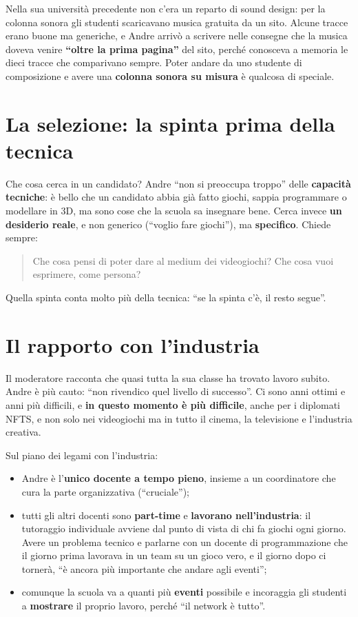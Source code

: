 Nella sua università precedente non c'era un reparto di sound design: per la
colonna sonora gli studenti scaricavano musica gratuita da un sito. Alcune tracce
erano buone ma generiche, e Andre arrivò a scrivere nelle consegne che la musica
doveva venire \textbf{``oltre la prima pagina''} del sito, perché conosceva a memoria
le dieci tracce che comparivano sempre. Poter andare da uno studente di composizione
e avere una \textbf{colonna sonora su misura} è qualcosa di speciale.

\section{La selezione: la spinta prima della tecnica}
\label{sec:c2-4-selezione}

Che cosa cerca in un candidato? Andre ``non si preoccupa troppo'' delle
\textbf{capacità tecniche}: è bello che un candidato abbia già fatto giochi, sappia
programmare o modellare in 3D, ma sono cose che la scuola sa insegnare bene. Cerca
invece \textbf{un desiderio reale}, e non generico (``voglio fare giochi''), ma
\textbf{specifico}. Chiede sempre:
\begin{quote}
  Che cosa pensi di poter dare al medium dei videogiochi? Che cosa vuoi esprimere,
  come persona?
\end{quote}
Quella spinta conta molto più della tecnica: ``se la spinta c'è, il resto
segue''.

\section{Il rapporto con l'industria}
\label{sec:c2-4-industria}

Il moderatore racconta che quasi tutta la sua classe ha trovato lavoro subito. Andre
è più cauto: ``non rivendico quel livello di successo''. Ci sono anni ottimi e anni
più difficili, e \textbf{in questo momento è più difficile}, anche per i diplomati
NFTS, e non solo nei videogiochi ma in tutto il cinema, la televisione e l'industria
creativa.

Sul piano dei legami con l'industria:
\begin{itemize}
  \item Andre è l'\textbf{unico docente a tempo pieno}, insieme a un coordinatore
        che cura la parte organizzativa (``cruciale'');
  \item tutti gli altri docenti sono \textbf{part-time} e \textbf{lavorano
        nell'industria}: il tutoraggio individuale avviene dal punto di vista di
        chi fa giochi ogni giorno. Avere un problema tecnico e parlarne con un
        docente di programmazione che il giorno prima lavorava in un team su un
        gioco vero, e il giorno dopo ci tornerà, ``è ancora più importante che
        andare agli eventi'';
  \item comunque la scuola va a quanti più \textbf{eventi} possibile e incoraggia
        gli studenti a \textbf{mostrare} il proprio lavoro, perché ``il network è
        tutto''.
\end{itemize}

